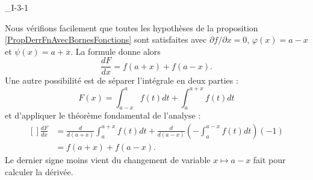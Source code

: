 

\begin{corrige}{_I-3-1}

Nous vérifions facilement que toutes les hypothèses de la proposition  \ref{PropDerrFnAvecBornesFonctions} sont satisfaites avec $\partial f/\partial x=0$, $\varphi(x)=a-x$ et $\psi(x)=a+x$. La formule donne alors
\begin{equation}
	\frac{ dF }{ dx }=f(a+x)+f(a-x).
\end{equation}
Une autre possibilité est de séparer l'intégrale en deux parties :
\begin{equation}
	F(x)=\int_{a-x}^af(t)dt + \int_{a}^{a+x}f(t)dt
\end{equation}
et d'appliquer le théorème fondamental de l'analyse :
\begin{equation}
	\begin{aligned}[]
	\frac{ dF }{ dx }	&=\frac{ d }{ d(a+x) }\int_a^{a+x}f(t)dt + \frac{ d }{ d(a-x) }\left( -\int_a^{a-x}f(t)dt \right)(-1)\\
				&=f(a+x)+f(a-x).
	\end{aligned}
\end{equation}
Le dernier signe moins vient du changement de variable $x\mapsto a-x$ fait pour calculer la dérivée.

\end{corrige}

